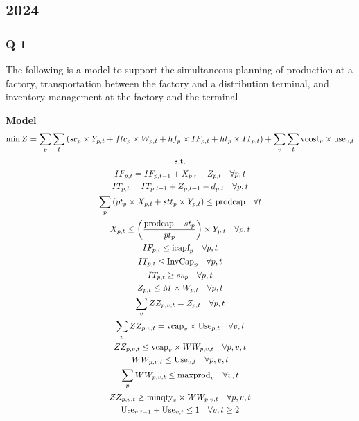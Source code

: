 \documentclass[10pt]{article}
\begin{document}
\subsection{2024}
\subsubsection{Q 1}
The following is a model to support the simultaneous planning of production at a factory, transportation between the factory and a distribution terminal, and inventory management at the factory and the terminal

\textbf{Model}
\begin{gather}
    \min Z = \sum_p\sum_t\left(sc_p\times Y_{p, t} + ftc_p\times W_{p, t} + hf_p\times IF_{p, t} + ht_p\times IT_{p, t}\right) + \sum_v\sum_t\text{vcost}_v\times \text{use}_{v, t}\notag\\
    \text{s.t.}\notag \\
    IF_{p, t} = IF_{p, t - 1} + X_{p, t} - Z_{p, t}\quad\forall p, t\\
    IT_{p, t} = IT_{p, t - 1} + Z_{p, t - 1} - d_{p, t}\quad\forall p, t\\
    \sum_p\left(pt_p\times X_{p, t} + stt_p\times Y_{p, t}\right) \le \text{prodcap}\quad\forall t\\
    X_{p, t}\le \left(\frac{\text{prodcap} - st_p}{pt_p}\right)\times Y_{p, t}\quad\forall p, t\\
    IF_{p, t}\le \text{icapf}_p \quad\forall p, t\\
    IT_{p, t}\le \text{InvCap}_p \quad\forall p, t\\
    IT_{p, t}\ge ss_p \quad\forall p, t\\
    Z_{p, t} \le M\times W_{p, t}\quad\forall p, t\\
    \sum_v ZZ_{p, v, t} = Z_{p, t} \quad\forall p, t\\
    \sum_v ZZ_{p, v, t} = \text{vcap}_v\times\text{Use}_{p, t}\quad\forall v, t\\
    ZZ_{p, v, t}\le \text{vcap}_v\times WW_{p, v, t}\quad\forall p, v, t\\
    WW_{p, v, t} \le \text{Use}_{v, t}\quad\forall p, v, t\\
    \sum_p WW_{p, v, t}\le \text{maxprod}_v\quad\forall v, t\\
    ZZ_{p, v, t}\ge \text{minqty}_v\times WW_{p, v, t}\quad\forall p, v, t \\
    \text{Use}_{v, t - 1} + \text{Use}_{v, t}\le 1\quad\forall v, t\ge 2\\

\end{gather}
\end{document}
